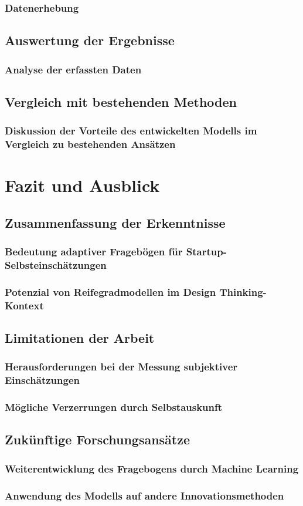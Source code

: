\subsection{Datenerhebung}

\section{Auswertung der Ergebnisse}
\subsection{Analyse der erfassten Daten}

\section{Vergleich mit bestehenden Methoden}
\subsection{Diskussion der Vorteile des entwickelten Modells im Vergleich zu bestehenden Ansätzen}

\chapter{Fazit und Ausblick}

\section{Zusammenfassung der Erkenntnisse}
\subsection{Bedeutung adaptiver Fragebögen für Startup-Selbsteinschätzungen}
\subsection{Potenzial von Reifegradmodellen im Design Thinking-Kontext}

\section{Limitationen der Arbeit}
\subsection{Herausforderungen bei der Messung subjektiver Einschätzungen}
\subsection{Mögliche Verzerrungen durch Selbstauskunft}

\section{Zukünftige Forschungsansätze}
\subsection{Weiterentwicklung des Fragebogens durch Machine Learning}
\subsection{Anwendung des Modells auf andere Innovationsmethoden}